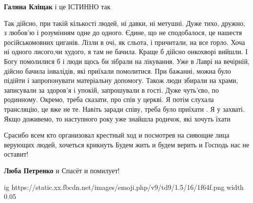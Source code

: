 \begin{itemize}
\begin{itemize}
\textbf{Галина Кліщак} і це ІСТИННО так
\end{itemize}

 

Так дійсно, при такій кількості людей, ні давки, ні метушні. Дуже тихо, дружно,
з любов'ю і розумінням одне до одного. Єдине, що не сподобалося, це нашестя
російськомовних циганів. Лізли в очі, як сльота, і причитали, на все горло.
Хоча ні одного лисого,чи худого, я там не бачила. Краще б дійсно онкохворі
вийшли. І Богу помолилися б і люди щось би зібрали на лікування. Уже в Лаврі на
вечірній, дійсно бачила інвалідів, які приїхали помолитися. При бажанні, можна
було підійти і запропонувати матеріальну допомогу. Також люди збирали на храми,
записували за здоров'я і упокій, запрошували в гості. Дуже чуть'єво, по
родинному. Окремо, треба сказати, про спів у церкві. Я потім слухала
трансляцію, це вже не те. Навіть заради співу, треба було приїхати . Я у
захваті. Якщо доживемо, то наступного року уже знайшла родичок, які хочуть
їхати


 

Срасибо всем кто организовал крестный ход и посмотрев на сияющие лица верующих
людей, хочеться крикнуть Будем жить и будем верить и Господь нас не оставит!

\begin{itemize}
 
\textbf{Люба Петренко} и Спасёт и помилует! 

\ifcmt
  ig https://static.xx.fbcdn.net/images/emoji.php/v9/td9/1.5/16/1f64f.png
  width 0.05
\fi

\end{itemize}

 

\end{itemize}
